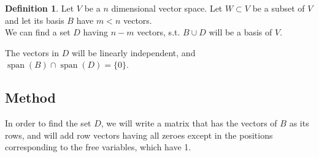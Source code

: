 \documentclass[fleqn, a4paper, 12pt]{article}
\theoremstyle{definition}
\newtheorem{definition}{Definition}
\theoremstyle{theorem}
\DeclareMathOperator{\vspan}{\mathrm{span}} %
\begin{document}
\begin{definition}
	Let $V$ be a $n$ dimensional vector space. Let $W \subset V$ be a subset of $V$ and let its basis $B$ have $m < n$ vectors.\\
	We can find a set $D$ having $n - m$ vectors, s.t. $B \cup D$ will be a basis of $V$.
\end{definition}
The vectors in $D$ will be linearly independent, and $\vspan(B) \cap \vspan(D) = \{0\}$.

\subsection{Method}

In order to find the set $D$, we will write a matrix that has the vectors of $B$ as its rows, and will add row vectors having all zeroes except in the positions corresponding to the free variables, which have 1.
\end{document}
